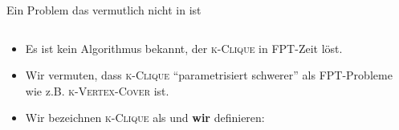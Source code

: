 \documentclass[navbaroff]{sdqbeamer}
\begin{document}
\begin{frame}[t]{Ein Problem das vermutlich nicht in \FPT ist}
    \vspace{-10pt}
    \begin{overlayarea}{1\textwidth}{1\textheight}
        \begin{columns}
            \begin{column}{0.65\textwidth}
                \begin{itemize}
                    \item<3-> Es ist kein Algorithmus bekannt, der \textsc{k-Clique}
                    in FPT-Zeit löst.
                    \item<4-> Wir vermuten, dass \textsc{k-Clique} \enquote{parametrisiert schwerer} als FPT-Probleme wie z.B. \textsc{k-Vertex-Cover} ist.
                    \item<5-> Wir bezeichnen \textsc{k-Clique} als  und \textbf{wir} definieren:
                \end{itemize}
                \vspace{-5pt}
            \end{column}
            \begin{column}{0.3\textwidth}
\end{column}
\end{columns}
\end{overlayarea}
\end{frame}
\end{document}
